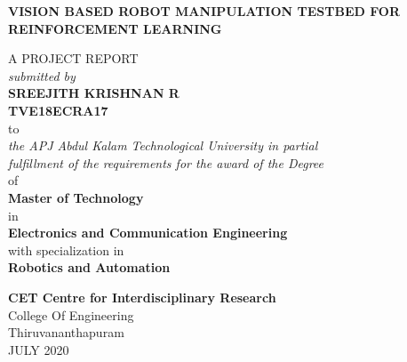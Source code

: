 \begin{titlepage}
	\thispagestyle{empty}
	\begin{center}
	\huge
	{\large \bf {VISION BASED ROBOT MANIPULATION TESTBED FOR REINFORCEMENT LEARNING}}\\
	\vspace{0.3cm}
	
	{\large A PROJECT REPORT}\\
	\vspace{-0.2cm}
	{\large {\it submitted by }}\\
	\vspace{-0.1cm}
	{ \Large \bf {SREEJITH KRISHNAN R}}\\
	\vspace{-0.3cm}
	{ \large \bf {TVE18ECRA17}}\\
	\vspace{-0.35cm}
	{ \large to}\\
	\vspace{-0.35cm}
	{ \large \it{the APJ Abdul Kalam Technological University in partial}}\\ 
	\vspace{-0.45cm}
	{ \large \it{fulfillment of the requirements for the award of  the Degree}}\\
	\vspace{-0.45cm}
	{\large \rm {of}}\\
	\vspace{0.15cm}
	{
		{ \large \bf {Master of Technology}}\\
		{\large \rm {in}}\\
		{ \large \bf {Electronics and Communication Engineering}}\\
		\vspace{0.15cm}
		{\large \rm {with specialization in}}\\
		\vspace{0.15cm}
		{ \large \bf {Robotics and Automation}}\\
	}
	\vspace{.18cm}
	\begin{figure}[ht]
		{\par}
	\end{figure}
	\vspace{-0.4cm}
	{\large \bf CET Centre for Interdisciplinary Research} \\
	
	{\large { College Of Engineering}}\\
	\vspace{-0.3cm}
	{\large {Thiruvananthapuram}}\\
	{\centering\large {JULY 2020}}\\
	\pagebreak
	\end{center}
\end{titlepage}